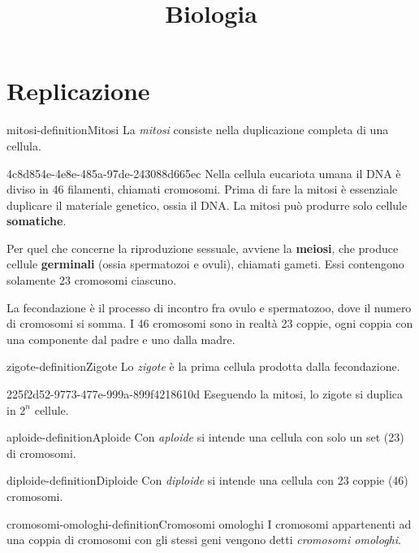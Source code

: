 \documentclass[preview]{standalone}
\begin{document}
\title{Biologia}
\genpage

\section{Replicazione}

\begin{snippetdefinition}{mitosi-definition}{Mitosi}
    La \textit{mitosi} consiste nella duplicazione completa di una cellula.
\end{snippetdefinition}

\begin{snippet}{4c8d854e-4e8e-485a-97de-243088d665ec}
    Nella cellula eucariota umana il DNA è diviso in 46 filamenti, chiamati cromosomi.
    Prima di fare la mitosi è essenziale duplicare il materiale genetico, ossia il DNA.
    La mitosi può produrre solo cellule \textbf{somatiche}.

    Per quel che concerne la riproduzione sessuale,
    avviene la \textbf{meiosi}, che produce cellule \textbf{germinali}
    (ossia spermatozoi e ovuli), chiamati gameti.
    Essi contengono solamente 23 cromosomi ciascuno.

    La fecondazione è il processo di incontro fra ovulo e spermatozoo,
    dove il numero di cromosomi si somma.
    I 46 cromosomi sono in realtà 23 coppie, ogni coppia con una componente dal padre e uno dalla madre.
\end{snippet}

\begin{snippetdefinition}{zigote-definition}{Zigote}
    Lo \textit{zigote} è la prima cellula prodotta dalla fecondazione.
\end{snippetdefinition}

\begin{snippet}{225f2d52-9773-477e-999a-899f4218610d}
    Eseguendo la mitosi, lo zigote si duplica in \(2^n\) cellule.
\end{snippet}

\begin{snippetdefinition}{aploide-definition}{Aploide}
    Con \textit{aploide} si intende una cellula con solo un set (23) di cromosomi.
\end{snippetdefinition}


\begin{snippetdefinition}{diploide-definition}{Diploide}
    Con \textit{diploide} si intende una cellula con 23 coppie (46) cromosomi.
\end{snippetdefinition}


\begin{snippetdefinition}{cromosomi-omologhi-definition}{Cromosomi omologhi}
    I cromosomi appartenenti ad una coppia di cromosomi con gli stessi geni vengono detti
    \textit{cromosomi omologhi}.
\end{snippetdefinition}

\end{document}
